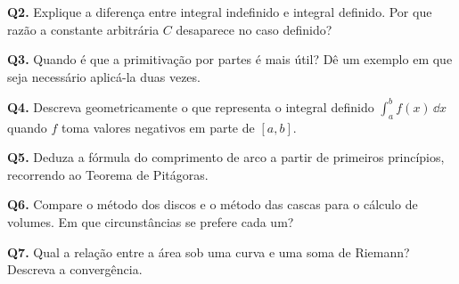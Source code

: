 \begin{oralbox}
  \textbf{Q2.} Explique a diferença entre integral indefinido e integral definido.
  Por que razão a constante arbitrária $C$ desaparece no caso definido?
\end{oralbox}

\begin{oralbox}
  \textbf{Q3.} Quando é que a primitivação por partes é mais útil? Dê um exemplo
  em que seja necessário aplicá-la duas vezes.
\end{oralbox}

\begin{oralbox}
  \textbf{Q4.} Descreva geometricamente o que representa o integral definido
  $\displaystyle\int_a^b f(x)\,\dd x$ quando $f$ toma valores negativos em parte de $[a,b]$.
\end{oralbox}

\begin{oralbox}
  \textbf{Q5.} Deduza a fórmula do comprimento de arco a partir de primeiros
  princípios, recorrendo ao Teorema de Pitágoras.
\end{oralbox}

\begin{oralbox}
  \textbf{Q6.} Compare o método dos discos e o método das cascas para o cálculo
  de volumes. Em que circunstâncias se prefere cada um?
\end{oralbox}

\begin{oralbox}
  \textbf{Q7.} Qual a relação entre a área sob uma curva e uma soma de Riemann?
  Descreva a convergência.
\end{oralbox}